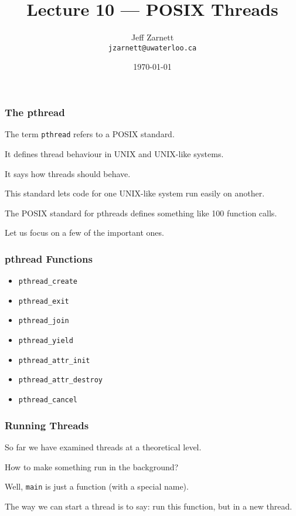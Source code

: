 

\title{Lecture 10 --- POSIX Threads}

\author{Jeff Zarnett \\ \small \texttt{jzarnett@uwaterloo.ca}}
\date{\today}




\begin{frame}
  \titlepage

 \end{frame}


\begin{frame}
\frametitle{The pthread}

The term \texttt{pthread} refers to a POSIX standard.


It defines thread behaviour in UNIX and UNIX-like systems.

It says how threads should behave. 

This standard lets code for one UNIX-like system run easily on another. 

The POSIX standard for pthreads defines something like 100 function calls.

Let us focus on a few of the important ones.

\end{frame}


\begin{frame}
\frametitle{pthread Functions}

\begin{itemize}
	\item \texttt{pthread\_create}
	\item \texttt{pthread\_exit}
	\item \texttt{pthread\_join}
	\item \texttt{pthread\_yield}
	\item \texttt{pthread\_attr\_init}
	\item \texttt{pthread\_attr\_destroy}
	\item \texttt{pthread\_cancel}
\end{itemize}



\end{frame}


\begin{frame}
\frametitle{Running Threads}

So far we have examined threads at a theoretical level.

How to make something run in the background?

Well, \texttt{main} is just a function (with a special name).

The way we can start a thread is to say: run this function, but in a new thread.

\end{frame}


